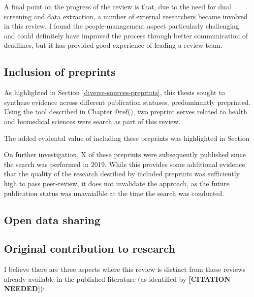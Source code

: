 \documentclass[a4paper, twoside]{templates/ociamthesis}
\begin{document}
A final point on the progress of the review is that, due to the need for dual screening and data extraction, a number of external researchers became involved in this review. I found the people-management aspect particularly challenging and could definitely have improved the process through better communication of deadlines, but it has provided good experience of leading a review team.

\hypertarget{inclusion-of-preprints}{%
\subsection{Inclusion of preprints}\label{inclusion-of-preprints}}

As highlighted in Section \ref{diverse-sources-preprints}, this thesis sought to syntheze evidence across different publication statuses, predominantly preprinted. Using the tool described in Chapter @ref(), two preprint serves related to health and biomedical sciences were search as part of this review.

The added evidental value of including these preprints was highlighted in Section

On further investigation, X of these preprints were subsequently published since the search was performed in 2019. While this provides some additional evidence that the quality of the research desribed by included preprints was sufficiently high to pass peer-review, it does not invalidate the approach, as the future publication status was unavaialble at the time the search was conducted.

\hypertarget{sys-rev-open-data}{%
\subsection{Open data sharing}\label{sys-rev-open-data}}

\hypertarget{original-contribution-to-research}{%
\subsection{Original contribution to research}\label{original-contribution-to-research}}

I believe there are three aspects where this review is distinct from those reviews already available in the published literature (as identified by \textbf{{[}CITATION NEEDED{]}}):
\end{document}
